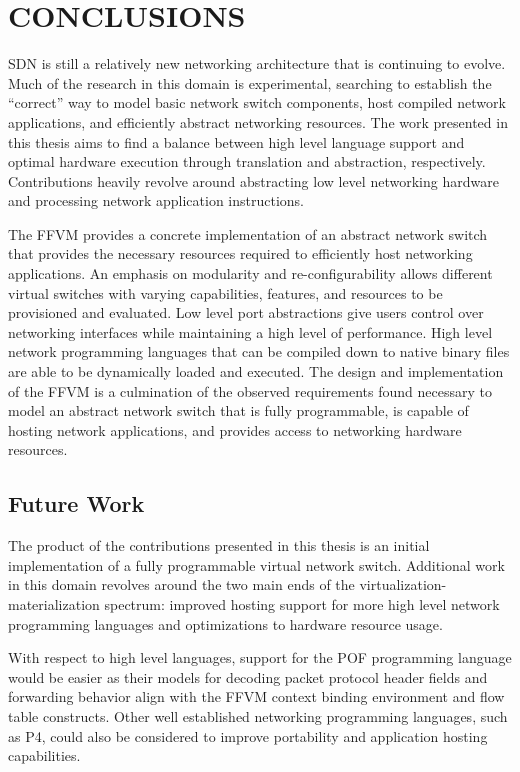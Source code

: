 \chapter{CONCLUSIONS}
\label{concl}
SDN is still a relatively new networking architecture that is continuing
to evolve. Much of the research in this domain is experimental, searching
to establish the ``correct'' way to model basic network switch components,
host compiled network applications, and efficiently abstract networking
resources. The work presented in this thesis aims to find a balance between
high level language support and optimal hardware execution through translation
and abstraction, respectively. Contributions heavily revolve around abstracting
low level networking hardware and processing network application instructions.

The FFVM provides a concrete implementation of an abstract network switch that
provides the necessary resources required to efficiently host networking
applications. An emphasis on modularity and re-configurability allows different
virtual switches with varying capabilities, features, and resources to be
provisioned and evaluated. Low level port abstractions give users control over
networking interfaces while maintaining a high level of performance. High level
network programming languages that can be compiled down to native binary files
are able to be dynamically loaded and executed. The design and implementation
of the FFVM is a culmination of the observed requirements found necessary to
model an abstract network switch that is fully programmable, is capable of
hosting network applications, and provides access to networking hardware
resources.

\section{Future Work}
\label{concl:future}
The product of the contributions presented in this thesis is an initial
implementation of a fully programmable virtual network switch. Additional
work in this domain revolves around the two main ends of the
virtualization-materialization spectrum: improved hosting support for more
high level network programming languages and optimizations to hardware resource
usage.

With respect to high level languages, support for the POF programming language
would be easier as their models for decoding packet protocol header fields and
forwarding behavior align with the FFVM context binding environment and flow
table constructs. Other well established networking programming languages,
such as P4, could also be considered to improve portability and application
hosting capabilities.

